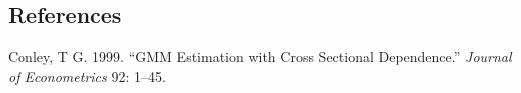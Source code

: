 \documentclass[
]{article}
\newlength{\cslhangindent}
\newenvironment{CSLReferences}[2] %
 {\begin{list}{}{%
  \setlength{\itemindent}{0pt}
  \setlength{\leftmargin}{0pt}
  \setlength{\parsep}{0pt}
  \ifodd #1
   \setlength{\leftmargin}{\cslhangindent}
   \setlength{\itemindent}{-1\cslhangindent}
  \fi
  \setlength{\itemsep}{#2\baselineskip}}}
 {\end{list}}
\begin{document}
\subsection*{References}\label{references}

\label{refs}
\begin{CSLReferences}{1}{0}
Conley, T G. 1999. {``GMM Estimation with Cross Sectional Dependence.''}
\emph{Journal of Econometrics} 92: 1--45.

\end{CSLReferences}
\end{document}
